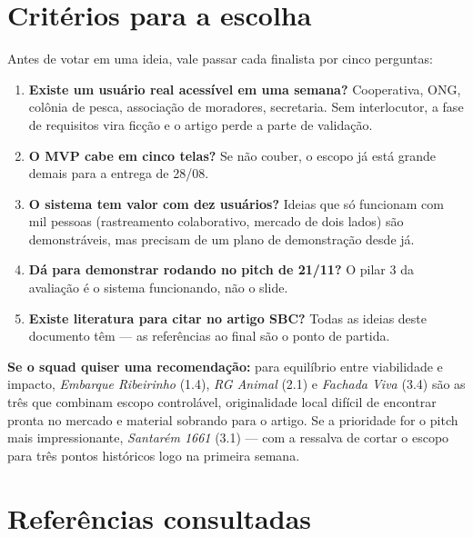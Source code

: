 \documentclass[11pt,a4paper]{article}
\begin{document}
\section*{Critérios para a escolha}

Antes de votar em uma ideia, vale passar cada finalista por cinco perguntas:

\begin{enumerate}
  \item \textbf{Existe um usuário real acessível em uma semana?} Cooperativa, ONG, colônia de pesca,
        associação de moradores, secretaria. Sem interlocutor, a fase de requisitos vira ficção e o
        artigo perde a parte de validação.
  \item \textbf{O MVP cabe em cinco telas?} Se não couber, o escopo já está grande demais para a
        entrega de 28/08.
  \item \textbf{O sistema tem valor com dez usuários?} Ideias que só funcionam com mil pessoas
        (rastreamento colaborativo, mercado de dois lados) são demonstráveis, mas precisam de um
        plano de demonstração desde já.
  \item \textbf{Dá para demonstrar rodando no pitch de 21/11?} O pilar 3 da avaliação é o sistema
        funcionando, não o slide.
  \item \textbf{Existe literatura para citar no artigo SBC?} Todas as ideias deste documento têm ---
        as referências ao final são o ponto de partida.
\end{enumerate}

\textbf{Se o squad quiser uma recomendação:} para equilíbrio entre viabilidade e impacto,
\textit{Embarque Ribeirinho} (1.4), \textit{RG Animal} (2.1) e \textit{Fachada Viva} (3.4) são as
três que combinam escopo controlável, originalidade local difícil de encontrar pronta no mercado e
material sobrando para o artigo. Se a prioridade for o pitch mais impressionante, \textit{Santarém
1661} (3.1) --- com a ressalva de cortar o escopo para três pontos históricos logo na primeira
semana.

\newpage

\section*{Referências consultadas}
\end{document}
